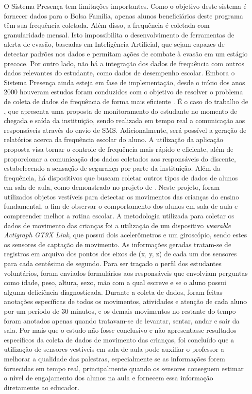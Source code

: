 O Sistema Presença tem limitações importantes. Como o objetivo deste sistema é fornecer dados para o Bolsa Família, apenas alunos beneficiários deste programa têm sua frequência coletada. Além disso, a frequência é coletada com granularidade mensal. Isto impossibilita o desenvolvimento de ferramentas de alerta de evasão, baseadas em Inteligência Artificial, que sejam capazes de detectar padrões nos dados e permitam ações de combate à evasão em um estágio precoce. Por outro lado, não há a integração dos dados de frequência com outros dados relevantes do estudante, como dados de desempenho escolar. Embora o Sistema Presença ainda esteja em fase de implementação, desde o início dos anos 2000 houveram estudos foram conduzidos com o objetivo de resolver o problema de coleta de dados de frequência de forma mais eficiente \cite{Soligo_2010}. É o caso do trabalho de , que apresenta uma proposta de monitoramento do estudante no momento de chegada e saída da instituição, sendo realizada em tempo real a comunicação aos responsáveis através do envio de SMS. Adicionalmente, será possível a geração de relatórios acerca da frequência escolar do aluno. A utilização da aplicação proposta visa tornar o controle de frequência mais rápido e eficiente, além de proporcionar a comunicação dos dados coletados aos responsáveis do discente, estabelecendo a sensação de segurança por parte da instituição. Além da frequência, há dispositivos que buscam coletar outros tipos de dados de alunos em sala de aula, como demonstrado no projeto de . Neste projeto, foram utilizados objetos vestíveis para detectar os movimentos das crianças do ensino fundamental, a fim de observar o comportamento dos alunos em sala de aula e compreender melhor a rotina escolar. A metodologia utilizada para coletar os dados de movimento das crianças foi a utilização de um dispositivo \textit{wearable Actigraph GT9X Link}, que possui dois acelerômetros e um giroscópio, sendo estes os sensores de captação de movimento. As informações geradas tratam-se de registros em arquivo dos pontos dos eixos de (x, y, z) de cada um dos sensores para cada centésimo de segundo. Para ser traçado o perfil dos estudantes voluntários, foram enviados formulários aos responsáveis que envolviam perguntas como idade, peso, altura, sexo, mão com a qual escreve e se o aluno possui alguma deficiência diagnosticada. Durante a coleta de dados, foram feitas anotações específicas de todos os movimentos, atividades e atenção de cada aluno por um período de 30 minutos, e os demais movimentos no restante do tempo foram anotados apenas quando tratavam-se de levantar, sentar, andar e sair da sala. Por mais que o estudo não fosse conclusivo e não apresentasse resultados específicos da coleta de dados de movimento das crianças, foi concluído que a utilização de sensores vestíveis em sala de aula pode auxiliar o professor a melhorar a qualidade das palestras, especialmente se as informações forem fornecidas em tempo real, principalmente quando os sensores conseguem estimar o nível de engajamento dos alunos na aula e fornecem essa informação diretamente ao educador.

